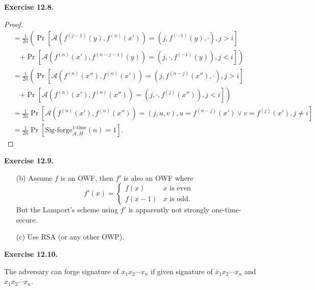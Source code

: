 \documentclass[a4paper]{article}
\newtheorem*{proof}{Proof}
\newenvironment{exercise}[1]{
	\par
	\noindent\textbf{Exercise #1.}\quad
}{
	\par
	\bigskip
}
\newcommand{\pbra}[1]{\left( #1 \right)}
\newcommand{\sbra}[1]{\left[ #1 \right]}
\newcommand{\Sigforge}{{\mathrm{Sig}\text{-}\mathrm{forge}}}
\newcommand{\onetime}{{\mathrm{1}\text{-}\mathrm{time}}}
\newcommand{\Acal}{\mathcal{A}}
\begin{document}
\begin{exercise}{12.8}
\begin{itemize}
\begin{proof}
\begin{align*}
                &=\frac1{2n}\left(
                \Pr\sbra{\Acal\pbra{f^{(j-1)}(y),f^{(n)}(x')}=\pbra{j,f^{(-1)}(y),\cdot},j>i}\right.\\
                &\quad
                \left.+\Pr\sbra{\Acal\pbra{f^{(n)}(x'),f^{(n-j-1)}(y)}=\pbra{j,\cdot,f^{(-1)}(y)},j<i}\right)\\
                &=\frac1{2n}\left(
                \Pr\sbra{\Acal\pbra{f^{(n)}(x''),f^{(n)}(x')}=\pbra{j,f^{(n-j)}(x''),\cdot},j>i}\right.\\
                &\quad
                \left.+\Pr\sbra{\Acal\pbra{f^{(n)}(x'),f^{(n)}(x'')}=\pbra{j,\cdot,f^{(j)}(x'')},j<i}\right)\\
                &=\frac1{2n}
                \Pr\sbra{\Acal\pbra{f^{(n)}(x'),f^{(n)}(x'')}=\pbra{j,u,v},u=f^{(n-j)}(x')\lor v=f^{(j)}(x'),j\neq i}\\
                &=\frac1{2n}\Pr\sbra{\Sigforge^\onetime_{\Acal,\Pi}(n)=1}.
            \end{align*}
        \end{proof}
\end{itemize}
\end{exercise}

\begin{exercise}{12.9}
    \begin{itemize}
        \item[(b)]
            Assume $f$ is an OWF, then $f'$ is also an OWF where
            $$
            f'(x)=\begin{cases}
                f(x) & x\text{ is even}\\
                f(x-1) & x\text{ is odd}.
            \end{cases}
            $$
            But the Lamport's scheme using $f'$ is apparently not strongly one-time-secure.
        \item[(c)]
            Use RSA (or any other OWP).
    \end{itemize}
\end{exercise}

\begin{exercise}{12.10}
    The adversary can forge signature of $x_1x_2\cdots x_n$ if given signature of 
    $\bar x_1x_2\cdots x_n$ and $x_1\overline{x_2\cdots x_n}$.
\end{exercise}
\end{document}
